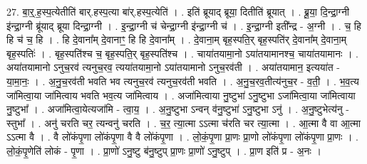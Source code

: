 \documentclass[17pt]{extarticle}
\begin{document}
27. बा॒र्॒.ह॒स्प॒त्येतीति॑ बार्.हस्प॒त्या बा॑र्.हस्प॒त्येति॑ । . इति॑ ब्रूयाद् ब्रूया॒ दितीति॑ ब्रूयात् । . ब्रू॒या॒ दि॒न्द्रा॒ग्नी इ॑न्द्रा॒ग्नी ब्रू॑याद् ब्रूया दिन्द्रा॒ग्नी । . इ॒न्द्रा॒ग्नी च॑ चेन्द्रा॒ग्नी इ॑न्द्रा॒ग्नी च॑ । . इ॒न्द्रा॒ग्नी इती᳚न्द्र - अ॒ग्नी । . च॒ हि हि च॑ च॒ हि । . हि दे॒वाना᳚म् दे॒वानाꣳ॒॒ हि हि दे॒वाना᳚म् । . दे॒वाना॒म् बृह॒स्पति॒र् बृह॒स्पति॑र् दे॒वाना᳚म् दे॒वाना॒म् बृह॒स्पतिः॑ । . बृह॒स्पति॑श्च च॒ बृह॒स्पति॒र् बृह॒स्पति॑श्च । . चाया॑तयामा॒नो ऽया॑तयामानश्च॒ चाया॑तयामानः । . अया॑तयामानो ऽनुच॒रव॑ त्यनुच॒रव॒ त्यया॑तयामा॒नो ऽया॑तयामानो ऽनुच॒रव॑ती । . अया॑तयामान॒ इत्यया॑त - या॒मा॒नः॒ । . अ॒नु॒च॒रव॑ती भवति भव त्यनुच॒रव॑ त्यनुच॒रव॑ती भवति । . अ॒नु॒च॒रव॒तीत्य॑नुच॒र - व॒ती॒ । . भ॒व॒त्य जा॑मित्वा॒या जा॑मित्वाय भवति भव॒त्य जा॑मित्वाय । . अजा॑मित्वाया नु॒ष्टुभा॑ ऽनु॒ष्टुभा ऽजा॑मित्वा॒या जा॑मित्वाया नु॒ष्टुभा᳚ । . अजा॑मित्वा॒येत्यजा॑मि - त्वा॒य॒ । . अ॒नु॒ष्टुभा ऽन्वन् व॑नु॒ष्टुभा॑ ऽनु॒ष्टुभा ऽनु॑ । . अ॒नु॒ष्टुभेत्य॑नु - स्तुभा᳚ । . अनु॑ चरति चर॒ त्यन्वनु॑ चरति । . च॒र॒ त्या॒त्मा ऽऽत्मा च॑रति चर त्या॒त्मा । . आ॒त्मा वै वा आ॒त्मा ऽऽत्मा वै । . वै लो॑कंपृ॒णा लो॑कंपृ॒णा वै वै लो॑कंपृ॒णा । . लो॒कं॒पृ॒णा प्रा॒णः प्रा॒णो लो॑कंपृ॒णा लो॑कंपृ॒णा प्रा॒णः । . लो॒कं॒पृ॒णेति॑ लोकं - पृ॒णा । . प्रा॒णो॑ ऽनु॒ष्टु ब॑नु॒ष्टुप् प्रा॒णः प्रा॒णो॑ ऽनु॒ष्टुप् । . प्रा॒ण इति॑ प्र - अ॒नः । \newline
\end{document}

